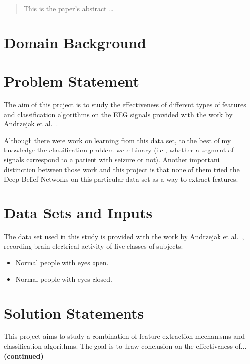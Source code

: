\documentclass[12pt]{article}
\begin{document}
\maketitle

\begin{abstract}
This is the paper's abstract \ldots
\end{abstract}

\section{Domain Background}

\section{Problem Statement}

The aim of this project is to study the effectiveness of different types of features and classification algorithms on the EEG signals provided with the work by Andrzejak et al.~\cite{andrzejak2001indications}.

Although there were work on learning from this data set, to the best of my knowledge the classification problem were binary (i.e., whether a segment of signals correspond to a patient with seizure or not). Another important distinction between those work and this project is that none of them tried the Deep Belief Networks on this particular data set as a way to extract features.

\section{Data Sets and Inputs}

The data set used in this study is provided with the work by Andrzejak et al.~\cite{andrzejak2001indications}, recording brain electrical activity of five classes of subjects:
\begin{itemize}
\item Normal people with eyes open.
\item Normal people with eyes closed.
\end{itemize}

\section{Solution Statements}

This project aims to study a combination of feature extraction mechanisms and classification algorithms. The goal is to draw conclusion on the effectiveness of...\textbf{(continued)}
\end{document}
